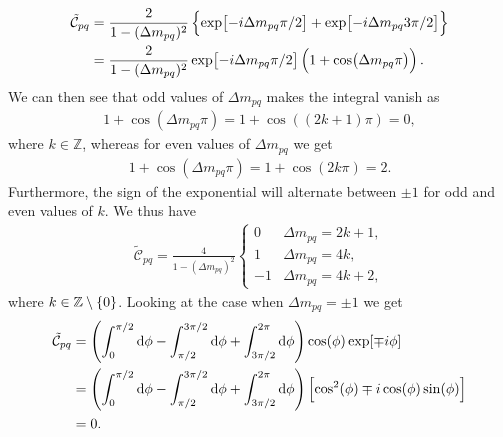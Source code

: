         \begin{align}
            \tilde{\mathcal{C}}_{pq}
            &=
            \frac{2}{1 - (\Delta m_{pq})^2}\left\{ 
                \exp[-i\Delta m_{pq} \pi / 2]
                + \exp[-i \Delta m_{pq} 3\pi / 2]
             \right\}
            \\
            &= \frac{2}{1 - (\Delta m_{pq})^2}
            \exp[-i\Delta m_{pq} \pi / 2]
            \left( 
                1 + \cos(\Delta m_{pq} \pi)
             \right).
        \end{align}
        We can then see that odd values of $\Delta m_{pq}$ makes the integral
        vanish as
        \begin{align}
            1 + \cos(\Delta m_{pq} \pi)
            = 1 + \cos((2k + 1) \pi) = 0,
        \end{align}
        where $k \in \mathbb{Z}$, whereas for even values of $\Delta m_{pq}$ we
        get
        \begin{align}
            1 + \cos(\Delta m_{pq} \pi)
            = 1 + \cos(2k \pi) = 2.
        \end{align}
        Furthermore, the sign of the exponential will alternate between $\pm 1$
        for odd and even values of $k$.
        We thus have
        \begin{align}
            \tilde{\mathcal{C}}_{pq}
            =
            \frac{4}{1 - (\Delta m_{pq})^2}
            \begin{cases}
                0 & \Delta m_{pq} = 2k + 1, \\
                1 & \Delta m_{pq} = 4k, \\
                -1 & \Delta m_{pq} = 4k + 2,
            \end{cases}
        \end{align}
        where $k \in \mathbb{Z} \setminus \left\{ 0 \right\}$.
        Looking at the case when $\Delta m_{pq} = \pm 1$ we get
        \begin{align}
            \tilde{\mathcal{C}}_{pq}
            &=
            \left( 
                \int_{0}^{\pi/2}
                \dd \phi
                -
                \int_{\pi/2}^{3\pi/2}
                \dd \phi
                +
                \int_{3\pi/2}^{2\pi}
                \dd \phi
             \right)
            \cos(\phi)
            \exp[\mp i\phi]
            \\
            &=
            \left( 
                \int_{0}^{\pi/2}
                \dd \phi
                -
                \int_{\pi/2}^{3\pi/2}
                \dd \phi
                +
                \int_{3\pi/2}^{2\pi}
                \dd \phi
             \right)
            \left[ 
                \cos^2(\phi)
                \mp i \cos(\phi)\sin(\phi)
             \right]
            \\
            &= 0.
        \end{align}
